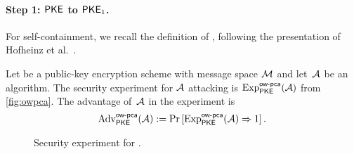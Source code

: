 \documentclass{iacrcc}
\begin{document}
\paragraph{Step 1: \INDCPA $\textsf{\upshape\mdseries PKE}$ to \OWPCA $\textsf{\upshape\mdseries PKE}_1$.}

For self-containment, we recall the definition of \OWPCA, following the
presentation of Hofheinz et al.~\cite{TCC:HofHovKil17}.

\begin{definition}
  \label{def:OW-CPA}
  Let \PKE be a public-key encryption scheme with message space
  $\mathcal{M}$ and let~$\mathcal{A}$ be an algorithm.  The \OWPCA security
  experiment for $\mathcal{A}$ attacking \PKE is
  $\mathrm{Exp}^{\textsf{\upshape\mdseries \textsf{\upshape\mdseries ow-pca}}}_{\textsf{\upshape\mdseries PKE}}(\mathcal{A})$ from \autoref{fig:owpca}.  The
  advantage of~$\mathcal{A}$ in the experiment is
  \[
    \mathrm{Adv}^{\textsf{\upshape\mdseries \textsf{\upshape\mdseries ow-pca}}}_{\textsf{\upshape\mdseries PKE}}(\mathcal{A}) := \Pr\left[
      \mathrm{Exp}^{\textsf{\upshape\mdseries \textsf{\upshape\mdseries ow-pca}}}_{\textsf{\upshape\mdseries PKE}}(\mathcal{A}) \Rightarrow 1 \right].
  \]
\end{definition}

\begin{figure}[h]
	\centering
	\caption{Security experiment for \OWPCA.}
	\label{fig:owpca}
\end{figure}
\end{document}
